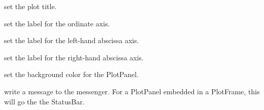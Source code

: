 \documentclass[letterpaper,10pt,english]{sphinxmanual}
\begin{document}

\begin{fulllineitems}
\label{plotpanel:set_title}
set the plot title.

\end{fulllineitems}



\begin{fulllineitems}
\label{plotpanel:set_xlabel}
set the label for the ordinate axis.

\end{fulllineitems}



\begin{fulllineitems}
\label{plotpanel:set_ylabel}
set the label for the left-hand abscissa axis.

\end{fulllineitems}



\begin{fulllineitems}
\label{plotpanel:set_y2label}
set the label for the right-hand abscissa axis.

\end{fulllineitems}



\begin{fulllineitems}
\label{plotpanel:set_bgcol}
set the background color for the PlotPanel.

\end{fulllineitems}



\begin{fulllineitems}
\label{plotpanel:write_message}
write a message to the messenger.  For a PlotPanel embedded in a PlotFrame,
this will go the the StatusBar.

\end{fulllineitems}


\end{document}
